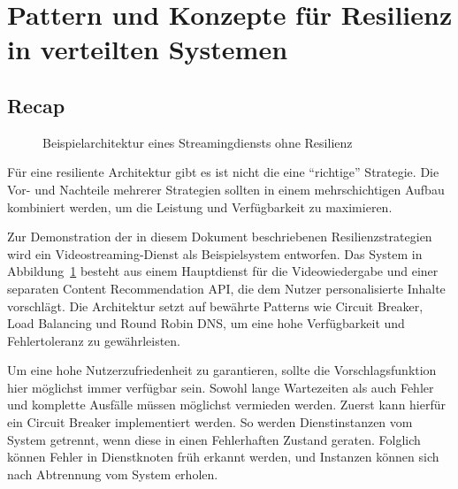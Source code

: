 \section{Pattern und Konzepte für Resilienz in verteilten Systemen}









\subsection{Recap}

\begin{figure}[t]
  \centering
  \resizebox{.8\linewidth}{!}{
  	
  }
  \caption{Beispielarchitektur eines Streamingdiensts ohne Resilienz}
    \label{fig:example-arch}
\end{figure}


		
Für eine resiliente Architektur gibt es ist nicht die eine \enquote{richtige} Strategie. Die Vor- und Nachteile mehrerer Strategien sollten in einem mehrschichtigen Aufbau kombiniert werden, um die Leistung und Verfügbarkeit zu maximieren.

Zur Demonstration der in diesem Dokument beschriebenen Resilienzstrategien wird ein Videostreaming-Dienst als Beispielsystem entworfen. Das System in Abbildung~\ref{fig:example-arch} besteht aus einem Hauptdienst für die Videowiedergabe und einer separaten Content Recommendation API, die dem Nutzer personalisierte Inhalte vorschlägt. Die Architektur setzt auf bewährte Patterns wie Circuit Breaker, Load Balancing und Round Robin DNS, um eine hohe Verfügbarkeit und Fehlertoleranz zu gewährleisten.

Um eine hohe Nutzerzufriedenheit zu garantieren, sollte die Vorschlagsfunktion hier möglichst immer verfügbar sein. Sowohl lange Wartezeiten als auch Fehler und komplette Ausfälle müssen möglichst vermieden werden. Zuerst kann hierfür ein Circuit Breaker implementiert werden. So werden Dienstinstanzen vom System getrennt, wenn diese in einen Fehlerhaften Zustand geraten. Folglich können Fehler in Dienstknoten früh erkannt werden, und Instanzen können sich nach Abtrennung vom System erholen.


